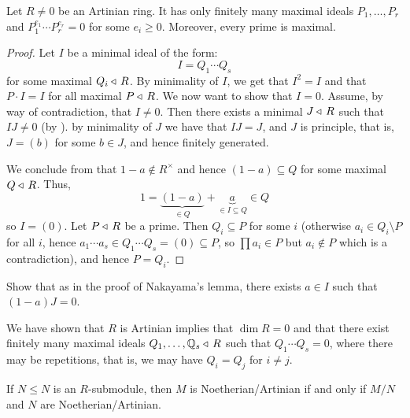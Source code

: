 \documentclass[11pt,a4paper]{article}
\begin{document}
\begin{lemma}
  Let $R \neq 0$ be an Artinian ring.
  It has only finitely many maximal ideals $P_1,\dots,P_r$ and
  $P_1^{e_1} \cdots P_r^{e_r} = 0$ for some $e_i \geq 0$.
  Moreover, every prime is maximal.
\end{lemma}
\begin{proof}
  Let $I$ be a minimal ideal of the form:
  \[
    I = Q_1 \cdots Q_s
  \]
  for some maximal $Q_i \triangleleft\, R$.
  By minimality of $I$,
  we get that $I^2 = I$ and that $P \cdot I = I$ for all maximal $P \triangleleft\, R$.
  We now want to show that $I = 0$.
  Assume, by way of contradiction, that $I \neq 0$.
  Then there exists a minimal $J \triangleleft\, R$ such that $IJ \neq 0$
  (by ).
  by minimality of $J$ we have that $IJ = J$,
  and $J$ is principle, that is, $J = (b)$ for some $b \in J$,
  and hence finitely generated.

  We conclude from 
  that $1 - a \notin R^{\times}$ and hence $(1 - a) \subseteq Q$
  for some maximal $Q \triangleleft\, R$.
  Thus,
  \[
    1 = \underbrace{(1 - a)}_{\in Q} + \underbrace{a}_{\in I \subseteq Q} \in Q
  \]
  so $I = (0)$.
  Let $P \triangleleft\, R$ be a prime.
  Then $Q_i \subseteq P$ for some $i$
  (otherwise $a_i \in Q_i \setminus P$ for all $i$,
  hence $a_1 \cdots a_s \in Q_1 \cdots Q_s = (0) \subseteq P$,
  so $\prod a_i \in P$ but $a_i \notin P$ which is a contradiction),
  and hence $P = Q_i$.
\end{proof}

\begin{exercise}
  \label{ex:lemma}
  Show that as in the proof of Nakayama's lemma, there exists $a \in I$
  such that $(1 - a)J = 0$.
\end{exercise}

\begin{remark}
  \label{rmk:artinian}
  We have shown that $R$ is Artinian implies that $\dim R = 0$ and
  that there exist finitely many maximal ideals $Q_1,\dots,\mathbb{Q}_s \triangleleft\, R$
  such that $Q_1 \cdots Q_s = 0$, where there may be repetitions,
  that is, we may have $Q_i = Q_j$ for $i \neq j$.
\end{remark}

\begin{exercise}
  \label{ex:hopkins}
  If $N \leqslant N$ is an $R$-submodule, then $M$ is Noetherian/Artinian
  if and only if $M/N$ and $N$ are Noetherian/Artinian.
\end{exercise}
\end{document}
